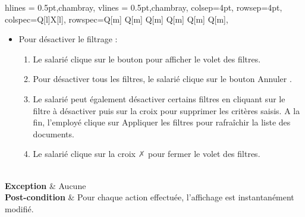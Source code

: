 \begin{longtblr}[caption={Description textuelle du CU « Gérer l'affichage des documents »}, , note{3} = {Les filtres actifs s’affichent au-dessus de la section \textbf{Détail du répertoire}.}]{
    hlines = {0.5pt,chambray},
    vlines = {0.5pt,chambray},    
    colsep=4pt,
    rowsep=4pt,
    colspec={Q[l]X[l]},
    rowspec={Q[m] Q[m] Q[m] Q[m] Q[m] Q[m]},
}
\begin{minipage}{\linewidth}
\begin{itemize}[leftmargin=*]
    \begin{enumerate}
        \item Le salarié clique sur le bouton .
        \item Parmi les 5 filtres proposés, le salarié clique sur les filtres souhaités. 
        \item Dans le champ qui s’affiche, le salarié renseigne les critères de filtrage.
        \item Le salarié clique  sur .
        \item Le salarié clique sur la croix \textcolor{gray}{\faClose} pour fermer le volet des filtres.
    \end{enumerate}
    \item Pour désactiver le filtrage :
    \begin{enumerate}
        \item Le salarié clique sur le bouton  pour afficher le volet des filtres.
        \item Pour désactiver tous les filtres, le salarié clique sur le bouton Annuler .
        \item Le salarié peut également désactiver certains filtres en cliquant sur le filtre à désactiver puis sur la croix  pour supprimer les critères saisis.
A la fin, l'employé clique sur Appliquer les filtres pour rafraîchir la liste des documents.
\item Le salarié clique sur la croix \textcolor{gray}{\faClose} pour fermer le volet des filtres.
    \end{enumerate}
\end{itemize}
\end{minipage}
\\
\textbf{Exception} & Aucune
\\
\textbf{Post-condition} & 
Pour chaque action effectuée, l’affichage est instantanément modifié.
\end{longtblr}
\break
{}
